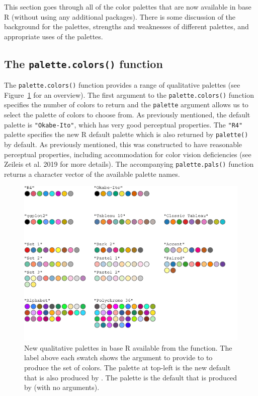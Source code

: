This section goes through all of the color palettes that are now
available in base R (without using any additional packages).
There is some discussion of the background for the palettes,
strengths and weaknesses of different palettes, and
appropriate uses of the palettes.

\hypertarget{the-palette.colors-function-1}{%
\subsection{\texorpdfstring{The \texttt{palette.colors()} function}{The palette.colors() function}}\label{the-palette.colors-function-1}}

The \texttt{palette.colors()} function provides a range of qualitative palettes (see
Figure~\ref{fig:newPalettes} for an overview).
The first argument to the \texttt{palette.colors()} function specifies
the number of colors to return and
the \texttt{palette} argument allows us to select the palette of colors
to choose from. As previously mentioned, the default palette
is \texttt{"Okabe-Ito"}, which has very good perceptual properties.
The \texttt{"R4"} palette specifies the new R default palette
which is also returned by \texttt{palette()} by default.
As previously mentioned, this was constructed to have
reasonable perceptual properties, including accommodation for
color vision deficiencies (see Zeileis et al. 2019 for more details).
The accompanying \texttt{palette.pals()} function returns a character
vector of the available palette names.

\begin{figure}[ht!]

{\centering \includegraphics[width=1\linewidth]{color_files/figure-latex/newPalettes-1} 

}

\caption{New qualitative palettes in base R available from the  function.  The label above each swatch shows the argument to provide to  to produce the set of colors.  The palette at top-left is the new default that is also produced by .  The  palette is the default that is produced by  (with no arguments).}\label{fig:newPalettes}
\end{figure}

